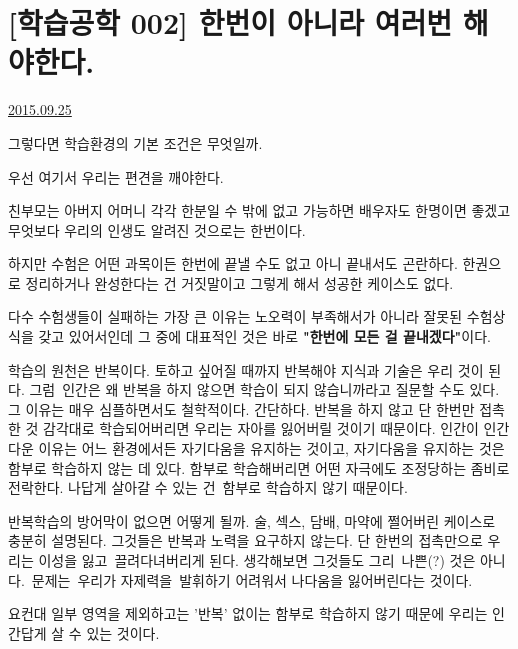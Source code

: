 \section{[학습공학 002] 한번이 아니라 여러번 해야한다.}
\href{https://www.kockoc.com/Apoc/345565}{2015.09.25}

\vspace{5mm}

그렇다면 학습환경의 기본 조건은 무엇일까.
\vspace{5mm}

우선 여기서 우리는 편견을 깨야한다.
\vspace{5mm}

친부모는 아버지 어머니 각각 한분일 수 밖에 없고
가능하면 배우자도 한명이면 좋겠고
무엇보다 우리의 인생도 알려진 것으로는 한번이다.
\vspace{5mm}

하지만 수험은
어떤 과목이든 한번에 끝낼 수도 없고 아니 끝내서도 곤란하다.
한권으로 정리하거나 완성한다는 건 거짓말이고 그렇게 해서 성공한 케이스도 없다.
\vspace{5mm}

다수 수험생들이 실패하는 가장 큰 이유는 노오력이 부족해서가 아니라 잘못된 수험상식을 갖고 있어서인데
그 중에 대표적인 것은 바로 \textbf{"한번에 모든 걸 끝내겠다"}이다.
\vspace{5mm}

학습의 원천은 반복이다. 토하고 싶어질 때까지 반복해야 지식과 기술은 우리 것이 된다.
그럼 인간은 왜 반복을 하지 않으면 학습이 되지 않습니까라고 질문할 수도 있다.
그 이유는 매우 심플하면서도 철학적이다.
간단하다. 반복을 하지 않고 단 한번만 접촉한 것 감각대로 학습되어버리면 우리는 자아를 잃어버릴 것이기 때문이다.
인간이 인간다운 이유는 어느 환경에서든 자기다움을 유지하는 것이고, 자기다움을 유지하는 것은 함부로 학습하지 않는 데 있다.
함부로 학습해버리면 어떤 자극에도 조정당하는 좀비로 전락한다.
나답게 살아갈 수 있는 건 함부로 학습하지 않기 때문이다.
\vspace{5mm}

반복학습의 방어막이 없으면 어떻게 될까. 술, 섹스, 담배, 마약에 쩔어버린 케이스로 충분히 설명된다.
그것들은 반복과 노력을 요구하지 않는다. 단 한번의 접촉만으로 우리는 이성을 잃고 끌려다녀버리게 된다.
생각해보면 그것들도 그리 나쁜(?) 것은 아니다. 문제는 우리가 자제력을 발휘하기 어려워서 나다움을 잃어버린다는 것이다.
\vspace{5mm}

요컨대 일부 영역을 제외하고는 '반복' 없이는 함부로 학습하지 않기 때문에 우리는 인간답게 살 수 있는 것이다.
\vspace{5mm}

